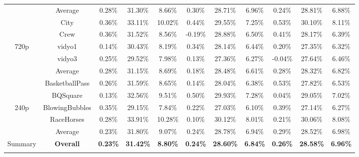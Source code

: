 \documentclass[lettersize,journal]{IEEEtran}
\begin{document}
\begin{table}[!h]
\begin{tabular}{c | c | c   c   c | c   c   c | c   c   c }
	           & Average        & 0.28\% & 31.30\% & 8.66\% & 0.30\% & 28.71\% & 6.96\% & 0.24\% & 28.81\% & 6.88\% \\ 
	    \cmidrule[0.75pt]{1-11}  
	           & City           & 0.36\% & 33.11\% &10.02\% & 0.44\% & 29.55\% & 7.25\% & 0.53\% & 30.10\% & 8.11\% \\          
	           & Crew           & 0.36\% & 31.52\% & 8.56\% &-0.19\% & 28.88\% & 6.50\% & 0.41\% & 28.17\% & 6.39\% \\  
	     720p  & vidyo1         & 0.14\% & 30.43\% & 8.19\% & 0.34\% & 28.14\% & 6.44\% & 0.20\% & 27.35\% & 6.32\% \\             
	           & vidyo3         & 0.25\% & 29.52\% & 7.98\% & 0.13\% & 27.36\% & 6.27\% &-0.04\% & 27.64\% & 6.46\% \\   
	    \cmidrule[0.75pt]{2-11} 
	           & Average        & 0.28\% & 31.15\% & 8.69\% & 0.18\% & 28.48\% & 6.61\% & 0.28\% & 28.32\% & 6.82\% \\ 
	    \cmidrule[0.75pt]{1-11}  
	           & BasketballPass & 0.26\% & 31.59\% & 8.65\% & 0.14\% & 28.04\% & 6.38\% & 0.53\% & 27.82\% & 6.53\% \\          
	           & BQSquare       & 0.13\% & 32.56\% & 9.51\% & 0.50\% & 29.93\% & 7.28\% & 0.04\% & 29.05\% & 7.02\% \\  
	     240p  & BlowingBubbles & 0.35\% & 29.15\% & 7.84\% & 0.22\% & 27.03\% & 6.10\% & 0.39\% & 27.14\% & 6.27\% \\             
	           & RaceHorses     & 0.28\% & 33.91\% &10.28\% & 0.10\% & 30.12\% & 8.01\% & 0.21\% & 30.06\% & 8.08\% \\   
	    \cmidrule[0.75pt]{2-11} 
	           & Average        & 0.23\% & 31.80\% & 9.07\% & 0.24\% & 28.78\% & 6.94\% & 0.29\% & 28.52\% & 6.98\% \\ 
	    \cmidrule[0.75pt]{1-11} 
	    Summary & \textbf{Overall} & \textbf{0.23\%} & \textbf{31.42\%} & \textbf{8.80\%} & \textbf{0.24\%} & \textbf{28.60\%} & \textbf{6.84\%} & \textbf{0.26\%} & \textbf{28.58\%} & \textbf{6.96\%} \\ 
		\midrule[0.75pt] \specialrule{0em}{0.35pt}{0.35pt} \midrule[0.75pt] %
	\end{tabular}
\end{table}
\end{document}
